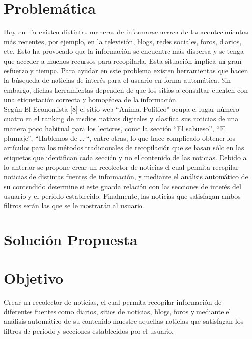 \documentclass{book}
\begin{document}
\section{Problemática}

Hoy en día existen distintas maneras de informarse acerca de los acontecimientos más recientes, por ejemplo, en la televisión, blogs, redes sociales, foros, diarios, etc. Esto ha provocado que la información se encuentre más dispersa y se tenga que acceder a muchos recursos para recopilarla. Esta situación implica un gran esfuerzo y tiempo. Para ayudar en este problema existen herramientas que hacen la búsqueda de noticias de interés para el usuario en forma automática. Sin embargo, dichas herramientas dependen de que los sitios a consultar cuenten con una etiquetación correcta y homogénea de la información.\\

Según El Economista [8] el sitio web “Animal Político” ocupa el lugar número cuatro en el ranking de medios nativos digitales y clasifica sus noticias de una manera poco habitual para los lectores, como la sección “El sabueso”, “El plumaje”, “Hablemos de … “, entre otras, lo que hace complicado obtener los artículos para los métodos tradicionales de recopilación que se basan sólo en las etiquetas que identifican cada sección y no el contenido de las noticias.
Debido a lo anterior se propone crear un recolector de noticias el cual permita recopilar noticias de distintas fuentes de información, y mediante el análisis automático de su contendido determine si este guarda relación con las secciones de interés del usuario y el periodo establecido. Finalmente, las noticias que satisfagan ambos filtros serán las que se le mostrarán al usuario.

\section{Solución Propuesta}

\section{Objetivo}

  Crear un recolector de noticias, el cual permita recopilar información de diferentes fuentes como diarios, sitios de noticias, blogs, foros y mediante el análisis automático de su contenido muestre aquellas noticias que satisfagan los filtros de período y secciones establecidos por el usuario.
  
\end{document}
